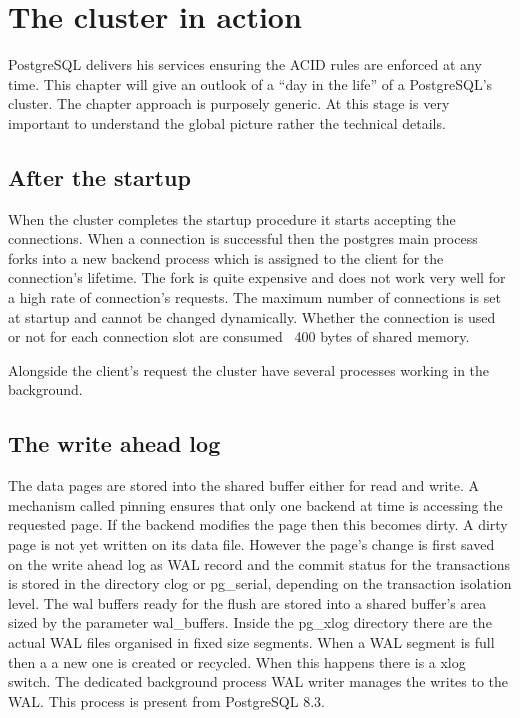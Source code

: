 \chapter{The cluster in action}
PostgreSQL delivers his services ensuring the ACID rules are enforced at any time. This chapter will give 
an outlook of a ``day in the life'' of a PostgreSQL's cluster. The chapter approach is purposely generic. 
At this stage is very important to understand the global picture rather the technical details. 

\section{After the startup}
When the cluster completes the startup procedure it starts accepting the connections. When a connection  
is successful then the postgres main process forks into a new backend process which is assigned to the 
client for the connection's lifetime. The fork is quite expensive and does not work very well for a 
high rate of connection's requests. The maximum number of connections is set at startup and cannot be 
changed dynamically. Whether the connection is used or not for each connection slot are consumed ~400 bytes 
of shared memory.\newline

Alongside the client's request the cluster have several processes working in the background. 

\section{The write ahead log} 
The data pages are stored into the shared buffer either for read and write. A mechanism called pinning 
ensures that only one backend at time is accessing the requested page. If the backend modifies the page then 
this becomes dirty. A dirty page is not yet written on its data file. However the page's 
change is first saved on the write ahead log as WAL record and the commit status for the transactions is 
stored in the directory clog or pg\_serial, depending on the transaction isolation level. The wal buffers 
ready for the flush are stored into a shared buffer's area sized by the parameter wal\_buffers.  
Inside the pg\_xlog directory there are the actual WAL files organised in fixed size segments. When a 
WAL segment is full then a a new one is created or recycled. When this happens there is a xlog switch. The 
dedicated background process WAL writer manages the writes to the WAL. This process 
is present from PostgreSQL 8.3.

